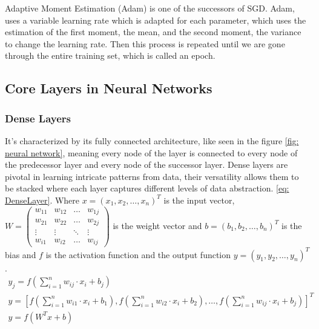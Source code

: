 Adaptive Moment Estimation (Adam)\cite{kingma_adam_2017} is one of the successors of SGD. Adam, uses a variable learning rate which is adapted for each parameter, which uses the estimation of the first moment, the mean, and the second moment, the variance to change the learning rate.
Then this process is repeated until we are gone through the entire training set, which is called an epoch.

\subsection*{Core Layers in Neural Networks}\label{subsec:core-layers-in-neural-networks}

\subsubsection{Dense Layers}
It's characterized by its fully connected architecture, like seen in the figure \ref{fig: neural network}, meaning every node of the layer is connected to every node of the predecessor layer and every node of the successor layer.
Dense layers are pivotal in learning intricate patterns from data, their versatility allows them to be stacked where each layer captures different levels of data abstraction.
\ref{eq: DenseLayer}.
Where $x = (x_1,x_2,\dots,x_n)^T$ is the input vector,
$W = \left(\begin{smallmatrix}w_{11} & w_{12} & \dots & w_{1j}\\w_{21} & w_{22} & \dots & w_{2j}\\\vdots & \vdots & \ddots & \vdots\\w_{i1} & w_{i2} & \dots & w_{ij}\end{smallmatrix}\right)$
is the weight vector and $b = (b_1,b_2,\dots,b_n)^T$ is the bias and $f$ is the activation function and the output function $y = (y_1,y_2,\dots,y_n)^T$.
\begin{gather}
    y_j = f\left( \sum^n_{i=1} w_{ij}\cdot x_i + b_j\right)\\
    y = \left[ f\left( \sum^n_{i=1} w_{i1} \cdot x_i + b_1\right),f\left( \sum^n_{i=1} w_{i2} \cdot x_i + b_2\right),\dots,f\left( \sum^n_{i=1} w_{ij} \cdot x_i + b_j\right) \right]^T\\
    y = f(W^T x+b)
    \label{eq: DenseLayer}
\end{gather}

